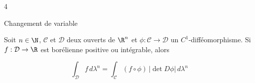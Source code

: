 
\begin{reponse}{4}

\begin{theoreme*}{Changement de variable}{}

Soit $n \in \N$, $\mathcal C$ et $\mathcal D$ deux ouverts de $\R^n$ et
$\phi : \mathcal C \to \mathcal D$ un $C^1$-difféomorphisme.
Si $f : \mathcal D \to \R$ est borélienne positive ou intégrable, alors

\[
\int_{\mathcal D} f \, d\lambda^n =
\int_{\mathcal C} (f \circ \phi)\, \left|\det D\phi\right| \, d\lambda^n
\]

\end{theoreme*}

\end{reponse}